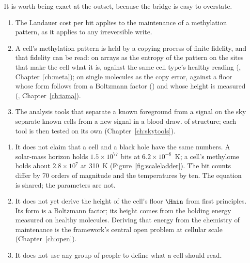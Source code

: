 It is worth being exact at the outset, because the bridge is easy to overstate.

\begin{keybox}[title=What the bridge claims]
\begin{enumerate}
\item The Landauer cost per bit applies to the maintenance of a methylation pattern, as it applies
      to any irreversible write. \derived
\item A cell's methylation pattern is held by a copying process of finite fidelity, and that fidelity can be read: on
      arrays as the entropy of the pattern on the sites that make the cell what it is, against the same cell type's healthy
      reading (\calibrated, Chapter~\ref{ch:meta}); on single molecules as the copy error, against a floor whose form follows
      from a Boltzmann factor (\derived) and whose height is measured (\measured, Chapter~\ref{ch:iama}).
\item The analysis tools that separate a known foreground from a signal on the sky separate known
      cells from a new signal in a blood draw. \analogy{} of structure; each tool is then tested on
      its own (Chapter~\ref{ch:skytools}).
\end{enumerate}
\end{keybox}

\begin{keybox}[title=What the bridge does not claim]
\begin{enumerate}
\item It does not claim that a cell and a black hole have the same numbers. A solar-mass horizon
      holds $1.5\times10^{77}$ bits at $6.2\times10^{-8}$~K; a cell's methylome holds about
      $2.8\times10^7$ at 310~K (Figure~\ref{fig:scaleladder}). The bit counts differ by 70 orders
      of magnitude and the temperatures by ten. The equation is shared; the parameters are not.
\item It does not yet derive the height of the cell's floor $\Hmin$ from first principles. Its form is a Boltzmann
      factor; its height comes from the holding energy measured on healthy molecules. Deriving that energy from the
      chemistry of maintenance is the framework's central open problem at cellular scale (Chapter~\ref{ch:open}).
\item It does not use any group of people to define what a cell should read.
\end{enumerate}
\end{keybox}

